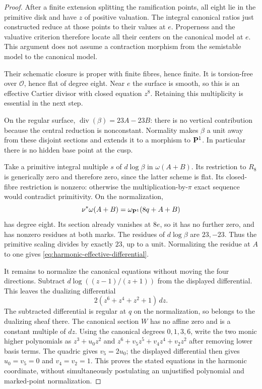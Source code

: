 \begin{proof}
After a finite extension splitting the ramification points, all eight
lie in the primitive disk and have $z$ of positive valuation.
The integral canonical ratios just constructed reduce at those
points to their values at $e$.  Properness and the valuative criterion
therefore locate all their centers on the canonical model at $e$.
This argument does not assume a contraction morphism from the
semistable model to the canonical model.

Their schematic closure is proper with finite fibres, hence finite.
It is torsion-free over $\mathcal O$, hence flat of degree eight.
Near $e$ the surface is smooth, so this is an effective Cartier
divisor with closed equation $z^8$.  Retaining this multiplicity is
essential in the next step.

On the regular surface, $\operatorname{div}(\beta)=23A-23B$:
there is no vertical contribution because the central reduction is
nonconstant.  Normality makes $\beta$ a unit away from these disjoint
sections and extends it to a morphism to $\mathbf P^1$.  In particular
there is no hidden base point at the cusp.

Take a primitive integral multiple $s$ of $d\log\beta$ in
$\omega(A+B)$.  Its restriction to $R_8$ is generically zero and
therefore zero, since the latter scheme is flat.  Its closed-fibre
restriction is nonzero: otherwise the multiplication-by-$\pi$ exact
sequence would contradict primitivity.  On the normalization,
\[
 \nu^*\omega(A+B)=\omega_{\mathbf P^1}(8q+A+B)
\]
has degree eight.  Its section already vanishes at $8e$, so it has
no further zero, and has nonzero residues at both marks.  The
residues of $d\log\beta$ are $23,-23$.  Thus the primitive scaling
divides by exactly $23$, up to a unit.  Normalizing the residue at
$A$ to one gives \cref{eq:harmonic-effective-differential}.

It remains to normalize the canonical equations without moving the
four directions.  Subtract $d\log((z-1)/(z+1))$ from the displayed
differential.  This leaves the dualizing differential
\[
 2(z^6+z^4+z^2+1)\,dz.
\]
The subtracted differential is regular at $q$ on the normalization,
so belongs to the dualizing sheaf there.  The canonical section $W$
has no affine zero and is a constant multiple of $dz$.
Using the canonical degrees $0,1,3,6$, write the two monic higher
polynomials as $z^3+u_0z^2$ and
$z^6+v_5z^5+v_4z^4+v_2z^2$ after removing lower basis terms.
The quadric gives $v_5=2u_0$; the displayed differential then gives
$u_0=v_5=0$ and $v_4=v_2=1$.  This proves the stated equations in
the harmonic coordinate, without simultaneously postulating an
unjustified polynomial and marked-point normalization.
\end{proof}

